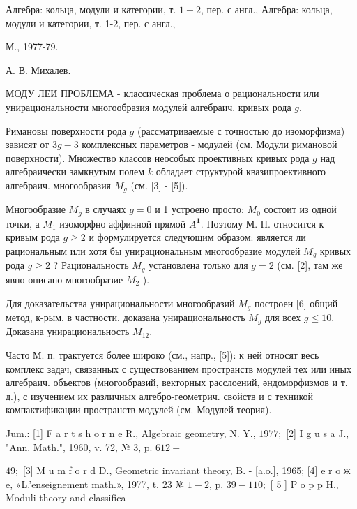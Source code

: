 \documentclass[10pt]{article}
\begin{document}
Алгебра: кольца, модули и категории, т. $1-2$, пер. с англ., Алгебра: кольца, модули и категории, т. 1-2, пер. с англ.,

М., 1977-79.

А. В. Михалев.



МОДУ ЛЕИ ПРОБЛЕМА - классическая проблема о рациональности или унирациональности многообразия модулей алгебраич. кривых рода $g$.



Римановы поверхности рода $g$ (рассматриваемые с точностью до изоморфизма) зависят от $3 g-3$ комплексных параметров - модулей (см. Модули римановой поверхности). Множество классов неособых проективных кривых рода $g$ над алгебраически замкнутым полем $k$ обладает структурой квазипроективного алгебраич. многообразия $M_{g}$ (см. [3] - [5]).



Многообразие $M_{g}$ в случаях $g=0$ и 1 устроено просто: $M_{0}$ состоит из одной точки, а $M_{1}$ изоморфно аффинной прямой $A^{\mathbf{1}}$. Поэтому М. П. относится к кривым рода $g \geqslant 2$ и формулируется следующим образом: является ли рациональным или хотя бы унирациональным многообразие модулей $M_{g}$ кривых рода $g \geqslant 2$ ? Рациональность $M_{g}$ установлена только для $g=2$ (см. [2], там же явно описано многообразие $M_{2}$ ).



Для доказательства унирациональности многообразий $M_{g}$ построен [6] общий метод, к-рым, в частности, доказана унирациональность $M_{g}$ для всех $g \leqslant 10$. Доказана унирациональность $M_{12}$.



Часто М. п. трактуется более широко (см., напр., [5]): к ней относят весь комплекс задач, связанных с существованием пространств модулей тех или иных алгебраич. объектов (многообразий, векторных расслоений, әндоморфизмов и т. д.), с изучением их различных алгебро-геометрич. свойств и с техникой компактификации пространств модулей (см. Модулей теория).



Jum.: [1] F a r t s h o r n e R., Algebraic geometry, N. Y., $1977 ;$ [2] I g u s a J., "Ann. Math.", 1960, v. 72, № 3, p. $612-$

$49 ;$ [3] M u m f o r d D., Geometric invariant theory, B. - [a.o.], 1965; [4] e r o ж e, «L.'enseignement math.», 1977, t. 23 № $1-2$, p. $39-110 ;$ [ 5 ] P o p p H., Moduli theory and classifica-
\end{document}

